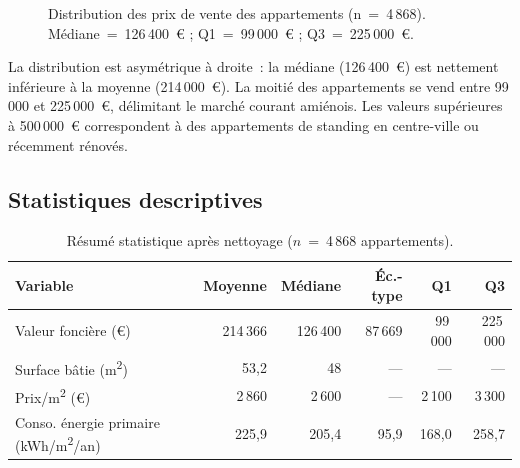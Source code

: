 \documentclass[12pt,a4paper]{article}
\begin{document}
\begin{figure}[htbp]
\centering
{}
\caption{Distribution des prix de vente des appartements (n~=~4\,868). M\'ediane~=~126\,400~\euro{} ; Q1~=~99\,000~\euro{} ; Q3~=~225\,000~\euro{}.}
\label{fig:dist_prix}
\end{figure}

\begin{descrbox}
La distribution est asym\'etrique \`a droite~: la m\'ediane (126\,400~\euro) est nettement inf\'erieure \`a la moyenne (214\,000~\euro). La moiti\'e des appartements se vend entre 99\,000 et 225\,000~\euro, d\'elimitant le march\'e courant amiénois. Les valeurs sup\'erieures \`a 500\,000~\euro{} correspondent \`a des appartements de standing en centre-ville ou r\'ecemment r\'enov\'es.
\end{descrbox}

\subsection{Statistiques descriptives}

\begin{table}[H]
\centering
\caption{R\'esum\'e statistique apr\`es nettoyage ($n$~=~4\,868 appartements).}
\label{tab:stats}
\small
\begin{tabular}{lrrrrr}
\toprule
\textbf{Variable} & \textbf{Moyenne} & \textbf{M\'ediane} & \textbf{\'Ec.-type} & \textbf{Q1} & \textbf{Q3} \\
\midrule
Valeur fonci\`ere (\euro) & 214\,366 & 126\,400 & 87\,669 & 99\,000 & 225\,000 \\
Surface b\^atie (m\textsuperscript{2}) & 53{,}2 & 48 & --- & --- & --- \\
Prix/m\textsuperscript{2} (\euro) & 2\,860 & 2\,600 & --- & 2\,100 & 3\,300 \\
Conso. \'energie primaire (kWh/m\textsuperscript{2}/an) & 225{,}9 & 205{,}4 & 95{,}9 & 168{,}0 & 258{,}7 \\
\bottomrule
\end{tabular}
\end{table}
\end{document}

